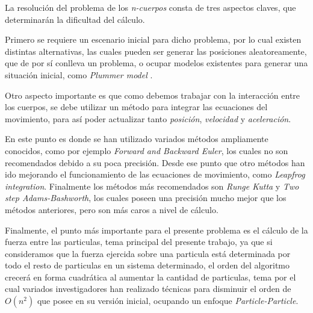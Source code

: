 
La resolución del problema de los \emph{n-cuerpos} consta de tres
aspectos claves, que determinarán la dificultad del cálculo.

Primero se requiere un escenario inicial para dicho problema,
por lo cual existen distintas alternativas, las cuales pueden ser
generar las posiciones aleatoreamente, que de por sí conlleva un problema,
o ocupar modelos existentes para generar una situación inicial,
como \emph{Plummer model} .

Otro aspecto importante es que como debemos trabajar con la interacción
entre los cuerpos, se debe utilizar un método para integrar las ecuaciones
del movimiento, para así poder actualizar tanto \emph{posición}, \emph{velocidad}
y \emph{aceleración}. 

En este punto es donde se han utilizado variados métodos ampliamente conocidos,
como por ejemplo \emph{Forward and Backward Euler}, los cuales no son recomendados
debido a su poca precisión. Desde ese punto que otro métodos han ido mejorando
el funcionamiento de las ecuaciones de movimiento, como \emph{Leapfrog integration}.
Finalmente los métodos más recomendados son \emph{Runge Kutta} y \emph{Two step Adams-Bashworth},
los cuales poseen una precisión mucho mejor que los métodos anteriores, pero son
más caros a nivel de cálculo.

Finalmente, el punto más importante para el presente problema es el cálculo
de la fuerza entre las particulas, tema principal del presente trabajo,
ya que si consideramos que la fuerza ejercida sobre una particula está determinada
por todo el resto de particulas en un sistema determinado, el orden del algoritmo
crecerá en forma cuadrática al aumentar la cantidad de particulas,
tema por el cual variados investigadores han realizado técnicas para disminuir
el orden de $O(n^2)$ que posee en su versión inicial, ocupando un enfoque
\emph{Particle-Particle}.
